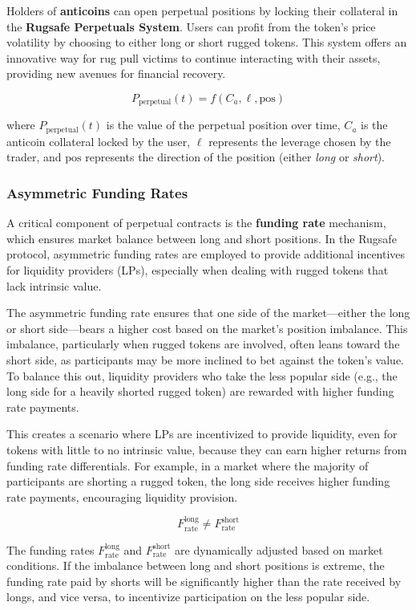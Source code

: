 \documentclass{article}
\begin{document}
Holders of \textbf{anticoins} can open perpetual positions by locking their collateral in the \textbf{Rugsafe Perpetuals System}. Users can profit from the token's price volatility by choosing to either long or short rugged tokens. This system offers an innovative way for rug pull victims to continue interacting with their assets, providing new avenues for financial recovery.

\[
P_{\text{perpetual}}(t) = f\left( C_a, \ell, \text{pos} \right)
\]

where \( P_{\text{perpetual}}(t) \) is the value of the perpetual position over time, \( C_a \) is the anticoin collateral locked by the user, \( \ell \) represents the leverage chosen by the trader, and \( \text{pos} \) represents the direction of the position (either \textit{long} or \textit{short}).

\subsubsection{Asymmetric Funding Rates}

A critical component of perpetual contracts is the \textbf{funding rate} mechanism, which ensures market balance between long and short positions. In the Rugsafe protocol, asymmetric funding rates are employed to provide additional incentives for liquidity providers (LPs), especially when dealing with rugged tokens that lack intrinsic value. 

The asymmetric funding rate ensures that one side of the market—either the long or short side—bears a higher cost based on the market's position imbalance. This imbalance, particularly when rugged tokens are involved, often leans toward the short side, as participants may be more inclined to bet against the token’s value. To balance this out, liquidity providers who take the less popular side (e.g., the long side for a heavily shorted rugged token) are rewarded with higher funding rate payments.

This creates a scenario where LPs are incentivized to provide liquidity, even for tokens with little to no intrinsic value, because they can earn higher returns from funding rate differentials. For example, in a market where the majority of participants are shorting a rugged token, the long side receives higher funding rate payments, encouraging liquidity provision.

\[
F_{\text{rate}}^{\text{long}} \neq F_{\text{rate}}^{\text{short}}
\]

The funding rates \( F_{\text{rate}}^{\text{long}} \) and \( F_{\text{rate}}^{\text{short}} \) are dynamically adjusted based on market conditions. If the imbalance between long and short positions is extreme, the funding rate paid by shorts will be significantly higher than the rate received by longs, and vice versa, to incentivize participation on the less popular side.
\end{document}
